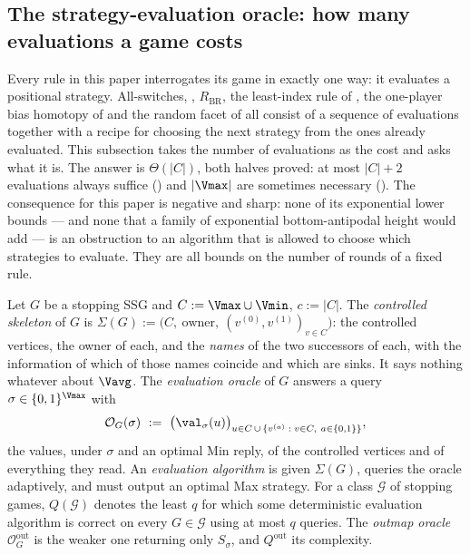 
\subsection{The strategy-evaluation oracle: how many evaluations a game costs}\label{sec:qm}

Every rule in this paper interrogates its game in exactly one way: it
evaluates a positional strategy.  All-switches, ,
$R_{\mathrm{BR}}$, the least-index rule of , the
one-player bias homotopy of  and the random facet of
 all consist of a sequence of evaluations together with a
recipe for choosing the next strategy from the ones already evaluated.
This subsection takes the number of evaluations as the cost and asks what
it is.  The answer is $\Theta(|C|)$, both halves proved: at most
$|C|+2$ evaluations always suffice () and $|\Vmax|$ are
sometimes necessary ().  The consequence for this paper
is negative and sharp: none of its exponential lower bounds --- and none
that a family of exponential bottom-antipodal height would add --- is an
obstruction to an algorithm that is allowed to choose which strategies to
evaluate.  They are all bounds on the number of rounds of a fixed rule.

\begin{definition}\label{def:qm-oracle}
Let $G$ be a stopping SSG and $C:=\Vmax\cup\Vmin$, $c:=|C|$.  The
\emph{controlled skeleton} of $G$ is
$\Sigma(G):=\bigl(C,\ \mathrm{owner},\ (v^{(0)},v^{(1)})_{v\in C}\bigr)$:
the controlled vertices, the owner of each, and the \emph{names} of the two
successors of each, with the information of which of those names coincide
and which are sinks.  It says nothing whatever about $\Vavg$.  The
\emph{evaluation oracle} of $G$ answers a query $\sigma\in\{0,1\}^{\Vmax}$
with
\[
  \mathcal O_G(\sigma)\ :=\
  \bigl(\val_\sigma(u)\bigr)_{u\in C\,\cup\,\{v^{(a)}\;:\;v\in C,\ a\in\{0,1\}\}},
\]
the values, under $\sigma$ and an optimal Min reply, of the controlled
vertices and of everything they read.  An \emph{evaluation algorithm} is
given $\Sigma(G)$, queries the oracle adaptively, and must output an
optimal Max strategy.  For a class $\mathcal G$ of stopping games,
$Q(\mathcal G)$ denotes the least $q$ for which some deterministic
evaluation algorithm is correct on every $G\in\mathcal G$ using at most
$q$ queries.  The \emph{outmap oracle} $\mathcal O^{\mathrm{out}}_G$ is
the weaker one returning only $S_\sigma$, and $Q^{\mathrm{out}}$ its
complexity.
\end{definition}

